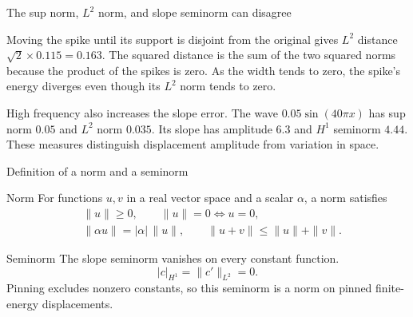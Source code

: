 \documentclass[aspectratio=169]{beamer}
\begin{document}
\begin{frame}{The sup norm, $L^2$ norm, and slope seminorm can disagree}
{Moving the spike until its support is disjoint from the original gives $L^2$ distance $\sqrt2\times0.115=0.163$.
The squared distance is the sum of the two squared norms because the product of the spikes is zero.
As the width tends to zero, the spike's energy diverges even though its $L^2$ norm tends to zero.

High frequency also increases the slope error.
The wave $0.05\sin(40\pi x)$ has sup norm $0.05$ and $L^2$ norm $0.035$.
Its slope has amplitude $6.3$ and $H^1$ seminorm $4.44$.
These measures distinguish displacement amplitude from variation in space.
}
\end{frame}

\begin{frame}{Definition of a norm and a seminorm}
\begin{block}{Norm}
For functions $u,v$ in a real vector space and a scalar $\alpha$, a norm satisfies
\[
\begin{aligned}
&\|u\|\ge0,\qquad \|u\|=0 \iff u=0,\\
&\|\alpha u\|=|\alpha|\,\|u\|,\qquad \|u+v\|\le\|u\|+\|v\|.
\end{aligned}
\]
\end{block}
\medskip
\begin{block}{Seminorm}
The slope seminorm vanishes on every constant function.
\[
|c|_{H^1}=\|c'\|_{L^2}=0.
\]
Pinning excludes nonzero constants, so this seminorm is a norm on pinned finite-energy displacements.
\end{block}
\end{frame}
\end{document}
